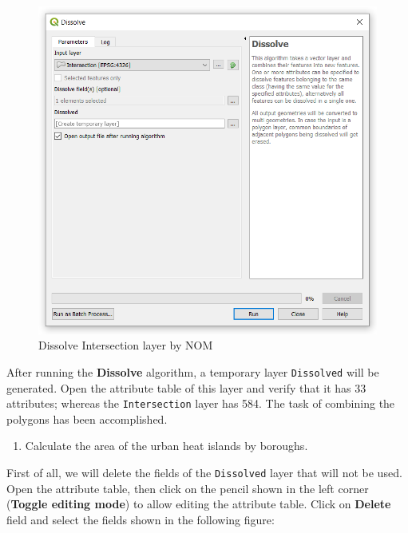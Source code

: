 \documentclass[]{book}
\providecommand{\tightlist}{%
  \setlength{\itemsep}{0pt}\setlength{\parskip}{0pt}}
\theoremstyle{definition}
\theoremstyle{definition}
\theoremstyle{definition}
\theoremstyle{remark}
\begin{document}
\begin{figure}

{\centering \includegraphics[width=10.6in]{figures/Dissolve_UHA} 

}

\caption{Dissolve Intersection layer by NOM}\label{fig:unnamed-chunk-32}
\end{figure}

After running the \textbf{Dissolve} algorithm, a temporary layer
\texttt{Dissolved} will be generated. Open the attribute table of this
layer and verify that it has 33 attributes; whereas the
\texttt{Intersection} layer has 584. The task of combining the polygons
has been accomplished.

\begin{enumerate}
\def\labelenumi{\arabic{enumi}.}
\setcounter{enumi}{6}
\tightlist
\item
  Calculate the area of the urban heat islands by boroughs.
\end{enumerate}

First of all, we will delete the fields of the \texttt{Dissolved} layer
that will not be used. Open the attribute table, then click on the
pencil shown in the left corner (\textbf{Toggle editing mode}) to allow
editing the attribute table. Click on \textbf{Delete} field and select
the fields shown in the following figure:
\end{document}
